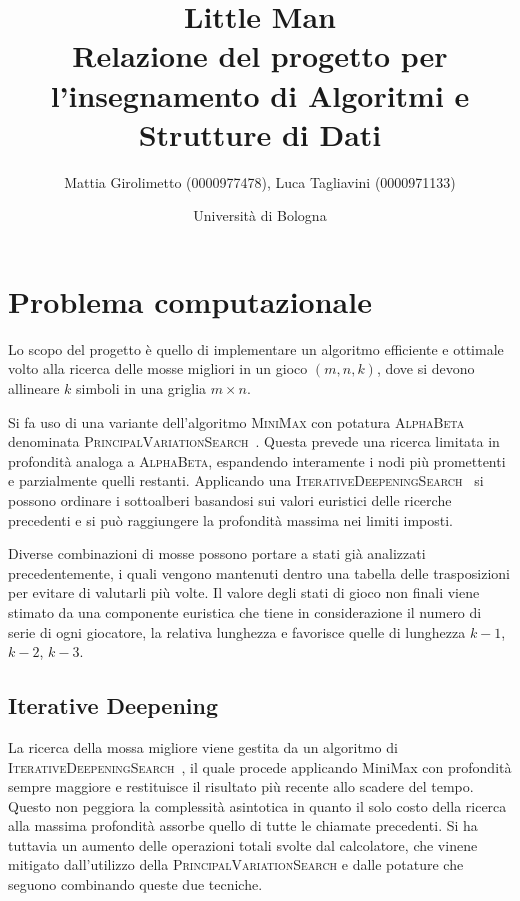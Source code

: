 \documentclass{article}
\title{Little Man\\
\large Relazione del progetto per l'insegnamento di Algoritmi e Strutture di Dati}
\author{
  Mattia Girolimetto (0000977478),
  Luca Tagliavini (0000971133)
}
\date{
	Universit\`a di Bologna \\
  \displaydate{date}
}
\begin{document}
\maketitle

\section*{Problema computazionale}

Lo scopo del progetto \`e quello di implementare un algoritmo efficiente e ottimale
volto alla ricerca delle mosse migliori in un gioco $(m,n,k)$, dove si devono
allineare $k$ simboli in una griglia $m \times n$.

Si fa uso di una variante dell'algoritmo \textsc{MiniMax} con potatura
\textsc{AlphaBeta} denominata \textsc{PrincipalVariationSearch}~\cite{negascout}. Questa
prevede  una ricerca limitata in profondit\`a analoga a \textsc{AlphaBeta}, espandendo 
interamente i nodi pi\`u promettenti e parzialmente quelli restanti. Applicando
una \textsc{IterativeDeepeningSearch}~\cite{id} si possono ordinare i sottoalberi
basandosi sui valori euristici delle ricerche precedenti e si pu\`o raggiungere
la profondit\`a massima nei limiti imposti.

Diverse combinazioni di mosse possono portare a stati gi\`a analizzati
precedentemente, i quali vengono mantenuti dentro una tabella delle trasposizioni
per evitare di valutarli pi\`u volte. Il valore degli stati di gioco non finali
viene stimato da una componente euristica che tiene in considerazione il numero
di serie di ogni giocatore, la relativa lunghezza e favorisce quelle di lunghezza
$k-1$, $k-2$, $k-3$.

\subsection*{Iterative Deepening}

La ricerca della mossa migliore viene gestita da un algoritmo di
\textsc{IterativeDeepeningSearch}~\cite{id}, il quale procede applicando MiniMax
con profondit\`a sempre maggiore e restituisce il risultato pi\`u recente allo
scadere del tempo. Questo non peggiora la complessit\`a asintotica in quanto il
solo costo della ricerca alla massima profondit\`a assorbe quello di tutte
le chiamate precedenti. Si ha tuttavia un aumento delle operazioni totali svolte
dal calcolatore, che vinene mitigato dall'utilizzo della
\textsc{PrincipalVariationSearch} e dalle potature che seguono combinando queste
due tecniche.
\end{document}
